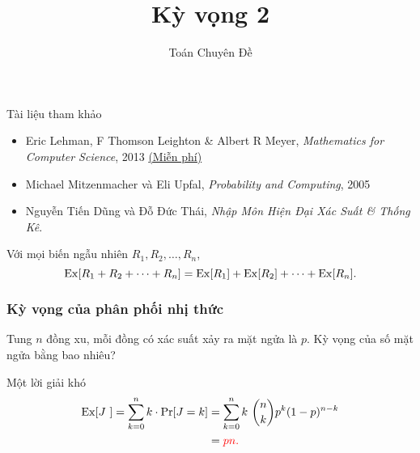 
\title{Kỳ vọng 2} 
 \author{Toán Chuyên Đề}   
 
\maketitle  

\begin{frame}{Tài liệu tham khảo}
  \begin{itemize}
  \item Eric Lehman, F Thomson Leighton \& Albert R Meyer,
    \textit{Mathematics for Computer Science}, 2013
    \href{https://www.seas.harvard.edu/courses/cs20/MIT6_042Notes.pdf}{\color{blue}(Miễn
    phí)}
  \item Michael Mitzenmacher và Eli Upfal, \textit{Probability and Computing}, 2005
  \item  Nguyễn Tiến Dũng và Đỗ Đức Thái, \textit{Nhập Môn Hiện Đại Xác Suất \& Thống Kê}.
  \end{itemize}
\end{frame}
 
\begin{frame}
	\begin{thrm}
		Với mọi biến ngẫu nhiên $R_1, R_2, \dots, R_n$,
		\[
			\mathrm{Ex}[R_1 + R_2 +\cdots + R_n] = \mathrm{Ex}[R_1] + \mathrm{Ex}[R_2] + \cdots + \mathrm{Ex}[R_n].
		\]
	\end{thrm}
\end{frame}

\begin{frame}
  \frametitle{Kỳ vọng của phân phối nhị thức} 
  \begin{qstn}
    Tung $n$ đồng xu, mỗi đồng có xác suất xảy ra mặt ngửa là
    $p$. Kỳ vọng của số mặt ngửa bằng bao nhiêu?  
  \end{qstn}
\end{frame}


\begin{frame}{Một lời giải khó}
\begin{align*}
\mathrm{Ex}[J\ ] = \sum_{k=0}^n k\cdot \mathrm{Pr}[J = k] &= \sum_{k=0}^nk\
                                        \binom{n}{k}p^k(1-p)^{n-k}\\
                                     &={\color{red}pn.}
\end{align*} 
\end{frame}

